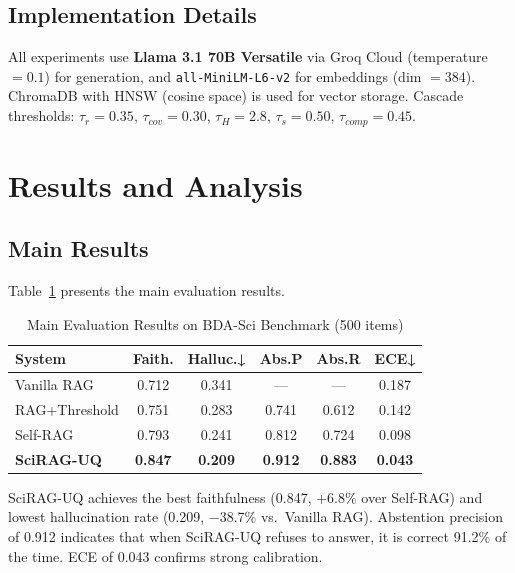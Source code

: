 \documentclass[conference]{IEEEtran}
\begin{document}
\subsection{Implementation Details}

All experiments use \textbf{Llama 3.1 70B Versatile} via Groq Cloud
(temperature $= 0.1$) for generation, and \texttt{all-MiniLM-L6-v2} for
embeddings (dim $= 384$). ChromaDB with HNSW (cosine space) is used for
vector storage. Cascade thresholds: $\tau_r = 0.35$, $\tau_{cov} = 0.30$,
$\tau_H = 2.8$, $\tau_s = 0.50$, $\tau_{comp} = 0.45$.

\section{Results and Analysis}
\label{sec:results}

\subsection{Main Results}

Table~\ref{tab:main} presents the main evaluation results.

\begin{table}[!t]
\caption{Main Evaluation Results on BDA-Sci Benchmark (500 items)}
\label{tab:main}
\centering
\small
\begin{tabular}{lccccc}
\toprule
\textbf{System} & \textbf{Faith.} & \textbf{Halluc.↓} & \textbf{Abs.P} & \textbf{Abs.R} & \textbf{ECE↓} \\
\midrule
Vanilla RAG         & 0.712 & 0.341 & ---   & ---   & 0.187 \\
RAG+Threshold       & 0.751 & 0.283 & 0.741 & 0.612 & 0.142 \\
Self-RAG            & 0.793 & 0.241 & 0.812 & 0.724 & 0.098 \\
\midrule
\textbf{SciRAG-UQ}  & \textbf{0.847} & \textbf{0.209} & \textbf{0.912} & \textbf{0.883} & \textbf{0.043} \\
\bottomrule
\end{tabular}
\end{table}

SciRAG-UQ achieves the best faithfulness (0.847, +6.8\% over Self-RAG) and
lowest hallucination rate (0.209, $-$38.7\% vs.\ Vanilla RAG). Abstention
precision of 0.912 indicates that when SciRAG-UQ refuses to answer, it is
correct 91.2\% of the time. ECE of 0.043 confirms strong calibration.
\end{document}
